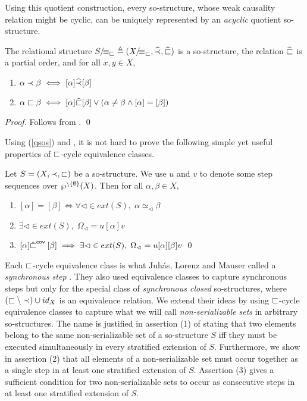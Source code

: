\documentclass{llncs}
\begin{document}
Using this quotient construction,  every so-structure, whose weak causality relation might be cyclic, can be uniquely represented by an \emph{acyclic} quotient so-structure. 
\begin{proposition} The relational structure ${S}/\!{\equiv_{\sqsubset}} \triangleq ({X}/\!{\equiv_{\sqsubset}},\widehat{\prec},\widehat{\sqsubset})$ is a so-structure, the relation $\widehat{\sqsubset}$ is a partial order, and for all $x,y\in X$,
\begin{enumerate}
\item $\alpha \prec \beta\iff [\alpha] \widehat{\prec} [\beta]$ 
\item $\alpha \sqsubset \beta \iff [\alpha] \widehat{\sqsubset} [\beta] \vee (\alpha\not=\beta \wedge [\alpha]=[\beta])$  
\end{enumerate}
\end{proposition}
\begin{proof} Follows from . \qed
\end{proof}

Using (\ref{qsos}) and , it is not hard to prove the following simple yet useful properties of $\sqsubset$-cycle equivalence classes.

\begin{proposition} Let $S = (X,\prec,\sqsubset)$ be a so-structure. We use $u$ and $v$  to denote some step sequences over $\wp^{\setminus \{\emptyset\}}(X)$. Then for all $\alpha,\beta \in X$,
	\begin{enumerate}
	\item $[\alpha]=[\beta] \iff  \forall \lhd \in ext(S),\; \alpha \simeq_{\lhd} \beta$
	\item $\exists\lhd \in ext(S),\; \Omega_{\lhd} = u[\alpha]v$
	\item $[\alpha] {\hat{\sqsubset}}^{\mathsf{cov}\;} [\beta] \implies \exists\lhd \in ext(S),\;\Omega_{\lhd} = u[\alpha][\beta]v$ \qed
	\end{enumerate}
\label{prop:covlsos}
\end{proposition}


Each $\sqsubset$-cycle equivalence class is what Juh\'as, Lorenz and Mauser called a \emph{synchronous step} \cite{JLM06,JLM08}. They also used equivalence classes to capture synchronous steps but only for the special class of \emph{synchronous closed} so-structures, where $(\sqsubset\setminus \prec)\cup id_{X}$ is an equivalence relation. We extend their ideas by using $\sqsubset$-cycle equivalence classes to capture what we will call  \emph{non-serializable sets} in arbitrary so-structures. The name is justified in assertion (1) of  stating that two elements belong to the same non-serializable set of a so-structure $S$ iff they must be executed simultaneously in every stratified extension of $S$. Furthermore, we show in assertion (2) that all elements of a non-serializable set must occur together as a single step in at least one stratified extension of $S$. Assertion (3) gives a sufficient condition for two non-serializable sets to occur as consecutive steps in at least one stratified extension of $S$.
\end{document}
